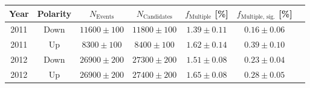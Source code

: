 \begin{tabular}{ccccccc}
  \toprule
  Year & Polarity & $N_{\text{Events}}$ & $N_{\text{Candidates}}$ & $f_{\text{Multiple}}$ [\si{\percent}] & $f_{\text{Multiple, sig.}}$ [\si{\percent}] \\
  \midrule
2011   & Down     & $11600 \pm 100$     & $11800 \pm 100$         & $1.39 \pm 0.11$                       & $0.16 \pm 0.06$                             \\
2011   & Up       & $8300 \pm 100$      & $8400 \pm 100$          & $1.62 \pm 0.14$                       & $0.39 \pm 0.10$                             \\
2012   & Down     & $26900 \pm 200$     & $27300 \pm 200$         & $1.51 \pm 0.08$                       & $0.23 \pm 0.04$                             \\
2012   & Up       & $26900 \pm 200$     & $27400 \pm 200$         & $1.65 \pm 0.08$                       & $0.28 \pm 0.05$                             \\
  \bottomrule
\end{tabular}
